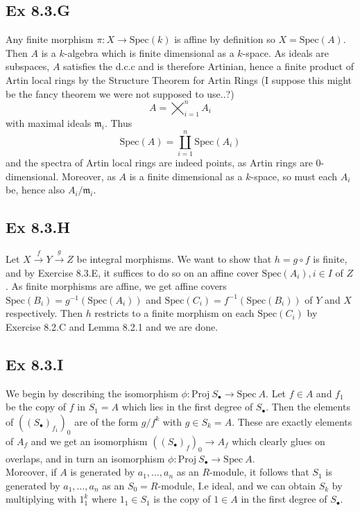 \documentclass{article}
\theoremstyle{definition}
\newcommand{\Spec}{\text{Spec}}
\newcommand{\Proj}{\text{Proj}}
\begin{document}
\subsection*{Ex 8.3.G}

Any finite morphism $\pi : X \to \Spec(k)$ is affine by definition so $X =
\Spec(A)$. Then $A$ is a $k$-algebra which is finite dimensional as a
$k$-space. As ideals are subspaces, $A$ satisfies the d.c.c and is therefore
Artinian, hence a finite product of Artin local rings by the Structure Theorem
for Artin Rings (I suppose this might be the fancy theorem we were not supposed
to use..?)
\[
    A
    =
    \bigtimes_{i = 1}^{n} A_i
\]
with maximal ideals $\mathfrak{m}_i$. Thus
\[
    \Spec(A)
    =
    \coprod_{i = 1}^{n} \Spec(A_i)
\]
and the spectra of Artin local rings are indeed points, as Artin rings are
$0$-dimensional. Moreover, as $A$ is a finite dimensional as a $k$-space, so
must each $A_i$ be, hence also $A_i/\mathfrak{m}_i$.

\subsection*{Ex 8.3.H}

Let $X \xrightarrow{f} Y \xrightarrow{g} Z$ be integral morphisms. We want to
show that $h = g \circ f$ is finite, and by Exercise 8.3.E, it suffices to do
so on an affine cover $\Spec(A_i),i \in I$ of $Z$. As finite morphisms are
affine, we get affine covers $\Spec(B_i) = g^{-1}(\Spec(A_i))$ and $\Spec(C_i)
= f^{-1}(\Spec(B_i))$ of $Y$ and $X$ respectively. Then $h$ restricts to a
finite morphism on each $\Spec(C_i)$ by Exercise 8.2.C and Lemma 8.2.1 and we
are done.

\subsection*{Ex 8.3.I}

We begin by describing the isomorphism $\phi : \Proj\ S_{\bullet} \to \Spec\
A$. Let $f \in A$ and $f_1$ be the copy of $f$ in $S_{1} = A$ which lies in the
first degree of $S_{\bullet}$. Then the elements of
$((S_{\bullet})_{f_{1}})_{0}$ are of the form $g/f^{k}$ with $g \in S_{k} = A$.
These are exactly elements of $A_{f}$ and we get an isomorphism
$((S_{\bullet})_f)_{0} \to A_f$ which clearly glues on overlaps, and in turn an
isomorphism $\phi : \Proj\ S_{\bullet} \to \Spec\ A$. \\ 

Moreover, if $A$ is generated by $a_{1}, \ldots, a_n$ as an $R$-module, it
follows that $S_{1}$ is generated by $a_{1}, \ldots, a_n$ as an
$S_{0}=R$-module, I.e ideal, and we can obtain $S_{k}$ by multiplying with
$1_1^{k}$ where $1_1 \in S_{1}$ is the copy of $1 \in A$ in the first degree of
$S_{\bullet}$.
\end{document}
